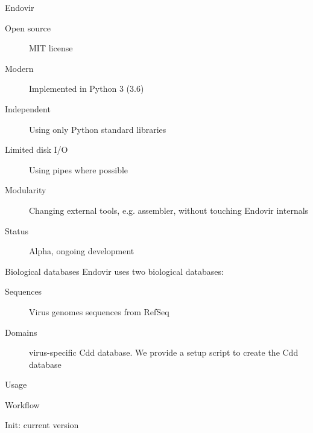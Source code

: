 \documentclass{beamer}
\begin{document}
  \begin{frame}{Endovir}
    \begin{description}
      \item[Open source] MIT license
      \item[Modern] Implemented in Python 3 (3.6)
      \item[Independent] Using only Python standard libraries
      \item[Limited disk I/O] Using pipes where possible
      \item[Modularity] Changing external tools, e.g. assembler,
                         without touching Endovir internals
      \item[Status] Alpha, ongoing development
    \end{description}
  \end{frame}

  \begin{frame}{Biological databases}
    Endovir uses two biological databases:
    \begin{description}
        \item[Sequences] Virus genomes sequences from RefSeq
        \item[Domains] virus-specific Cdd database. We provide a setup script
                       to create the Cdd database
    \end{description}
  \end{frame}

  \begin{frame}{Usage}
    
  \end{frame}

  \begin{frame}{Workflow}
    \resizebox{\linewidth}{!}{}
  \end{frame}


  \begin{frame}{Init: current version}
    \resizebox{\linewidth}{!}{}
  \end{frame}
\end{document}
